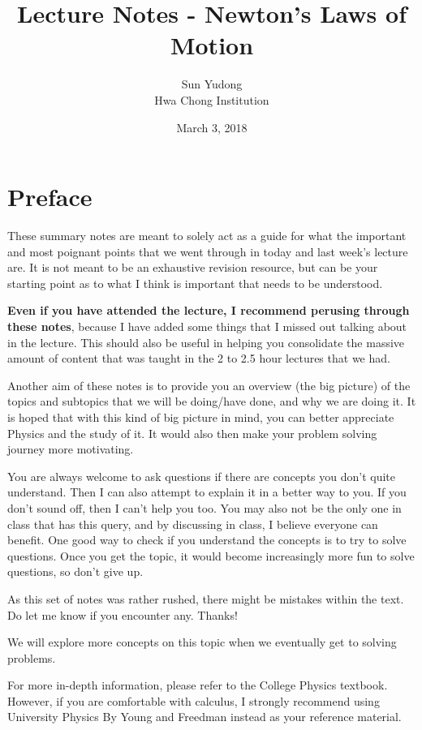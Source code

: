 \documentclass[11pt]{article}
\title{Lecture Notes - Newton's Laws of Motion}
\author{Sun Yudong\\Hwa Chong Institution}
\date{March 3, 2018}
\numberwithin{equation}{section}
\begin{document}
	\maketitle
	\section*{Preface}
	These summary notes are meant to solely act as a guide for what the important and most poignant points that we went through in today and last week's lecture are. It is not meant to be an exhaustive revision resource, but can be your starting point as to what I think is important that needs to be understood. 
	
	\textbf{Even if you have attended the lecture, I recommend perusing through these notes}, because I have added some things that I missed out talking about in the lecture. This should also be useful in helping you consolidate the massive amount of content that was taught in the 2 to 2.5 hour lectures that we had. 
	
	Another aim of these notes is to provide you an overview (the big picture) of the topics and subtopics that we will be doing/have done, and why we are doing it. It is hoped that with this kind of big picture in mind, you can better appreciate Physics and the study of it. It would also then make your problem solving journey more motivating. 
	
	You are always welcome to ask questions if there are concepts you don't quite understand. Then I can also attempt to explain it in a better way to you. If you don't sound off, then I can't help you too. You may also not be the only one in class that has this query, and by discussing in class, I believe everyone can benefit. One good way to check if you understand the concepts is to try to solve questions. Once you get the topic, it would become increasingly more fun to solve questions, so don't give up.
	
	As this set of notes was rather rushed, there might be mistakes within the text. Do let me know if you encounter any. Thanks!
	
	We will explore more concepts on this topic when we eventually get to solving problems.
	
	For more in-depth information, please refer to the College Physics textbook. However, if you are comfortable with calculus, I strongly recommend using University Physics By Young and Freedman instead as your reference material.
	
	\textcolor[HTML]{aaaaaa}{\ccbysa}
	
\end{document}
